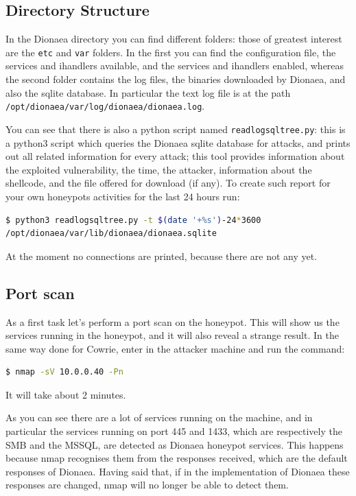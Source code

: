 \documentclass[epsfig,a4paper,11pt,titlepage,oneside,openany]{book}
\begin{document}
\subsection{Directory Structure}

In the Dionaea directory you can find different folders: those of greatest interest are the \texttt{etc} and \texttt{var} folders. In the first you can find the configuration file, the services and ihandlers available, and the services and ihandlers enabled, whereas the second folder contains the log files, the binaries downloaded by Dionaea, and also the sqlite database. In particular the text log file is at the path \texttt{/opt/dionaea/var/log/dionaea/dionaea.log}.

You can see that there is also a python script named \texttt{readlogsqltree.py}: this is a python3 script which queries the Dionaea sqlite database for attacks, and prints out all related information for every attack; this tool provides information about the exploited vulnerability, the time, the attacker, information about the shellcode, and the file offered for download (if any). To create such report for your own honeypots activities for the last 24 hours run:
\begin{lstlisting}[language=bash]
$ python3 readlogsqltree.py -t $(date '+%s')-24*3600 
/opt/dionaea/var/lib/dionaea/dionaea.sqlite
\end{lstlisting}
At the moment no connections are printed, because there are not any yet.

\subsection{Port scan}

As a first task let’s perform a port scan on the honeypot. This will show us the services running in the honeypot, and it will also reveal a strange result. In the same way done for Cowrie, enter in the attacker machine and run the command:
\begin{lstlisting}[language=bash]
$ nmap -sV 10.0.0.40 -Pn
\end{lstlisting}
It will take about 2 minutes.

As you can see there are a lot of services running on the machine, and in particular the services running on port 445 and 1433, which are respectively the SMB and the MSSQL, are detected as Dionaea honeypot services. This happens because nmap recognises them from the responses received, which are the default responses of Dionaea. Having said that, if in the implementation of Dionaea these responses are changed, nmap will no longer be able to detect them.
\end{document}
